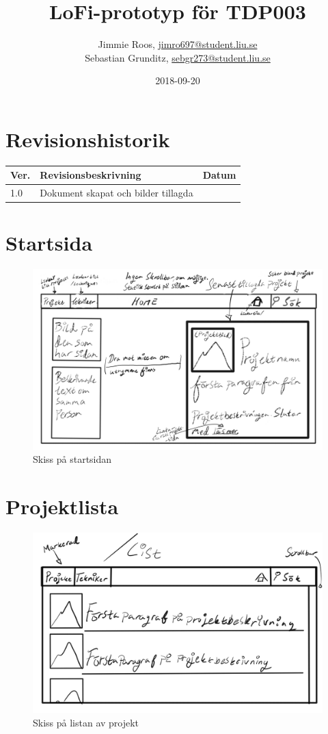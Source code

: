 \documentclass{TDP003mall}
\author{Jimmie Roos, \url{jimro697@student.liu.se}\\
        Sebastian Grunditz, \url{sebgr273@student.liu.se}}
\title{LoFi-prototyp för TDP003}
\date{2018-09-20}
\begin{document}
\projectpage
\section{Revisionshistorik}
\begin{table}[!h]
\begin{tabularx}{\linewidth}{|l|X|l|}
\hline
Ver. & Revisionsbeskrivning & Datum \\\hline
1.0 & Dokument skapat och bilder tillagda \\\hline
\end{tabularx}
\end{table}


\section{Startsida}
\begin{figure}[H]
  \includegraphics[width=\linewidth]{index.jpg}
  \caption{Skiss på startsidan}
  \label{fig:index}
\end{figure}

\section{Projektlista}
\begin{figure}[H]
  \includegraphics[width=\linewidth]{list.jpg}
  \caption{Skiss på listan av projekt}
  \label{fig:projektlista}
\end{figure}
\end{document}
